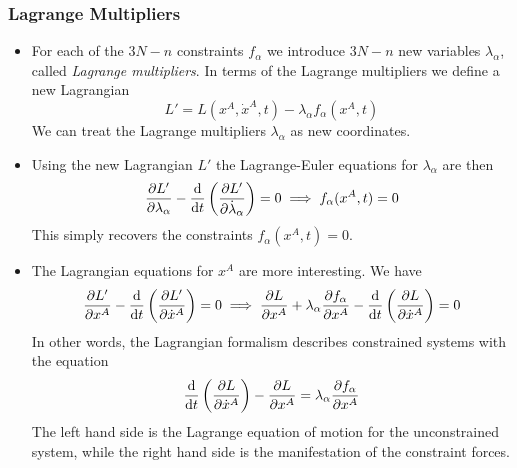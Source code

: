 \documentclass[11pt, a4paper]{article}
\begin{document}
\subsubsection{Lagrange Multipliers}
\begin{itemize}
	
	\item For each of the $ 3N -n  $ constraints $ f_{\alpha} $ we introduce $ 3N - n $ new variables $ \lambda_{\alpha} $, called \textit{Lagrange multipliers}. In terms of the Lagrange multipliers we define a new Lagrangian
	\begin{equation*}
		L' = L(x^{A}, \dot{x}^{A}, t) - \lambda_{\alpha}f_{\alpha}(x^{A}, t)
	\end{equation*}
	We can treat the Lagrange multipliers $ \lambda_{\alpha} $ as new coordinates. 
	
	\item Using the new Lagrangian $ L' $ the Lagrange-Euler equations for $ \lambda_{\alpha} $ are then
	\begin{equation*}
		\pdv{L'}{\lambda_{\alpha}} - \dv{}{t}\left(\pdv{L'}{\dot{\lambda}_{\alpha}} \right) = 0 \implies f_{\alpha}(x^{A}, t) = 0 
	\end{equation*}
	This simply recovers the constraints $ f_{\alpha}(x^{A}, t) = 0  $. 
	
	\item The Lagrangian equations for $ x^{A} $ are more interesting. We have
	\begin{equation*}
		\pdv{L'}{x^{A}} - \dv{}{t}\left(\pdv{L'}{\dot{x}^{A}} \right) = 0 \implies \pdv{L}{x^{A}} + \lambda_{\alpha} \pdv{f_{\alpha}}{x^{A}} -  \dv{}{t}\left(\pdv{L}{\dot{x}^{A}} \right) = 0
	\end{equation*}
	In other words, the Lagrangian formalism describes constrained systems with the equation
	\begin{equation*}
		 \dv{}{t}\left(\pdv{L}{\dot{x}^{A}} \right) - \pdv{L}{x^{A}} = \lambda_{\alpha} \pdv{f_{\alpha}}{x^{A}}
	\end{equation*}
	The left hand side is the Lagrange equation of motion for the unconstrained system, while the right hand side is the manifestation of the constraint forces.
	
\end{itemize}

	
\end{document}
